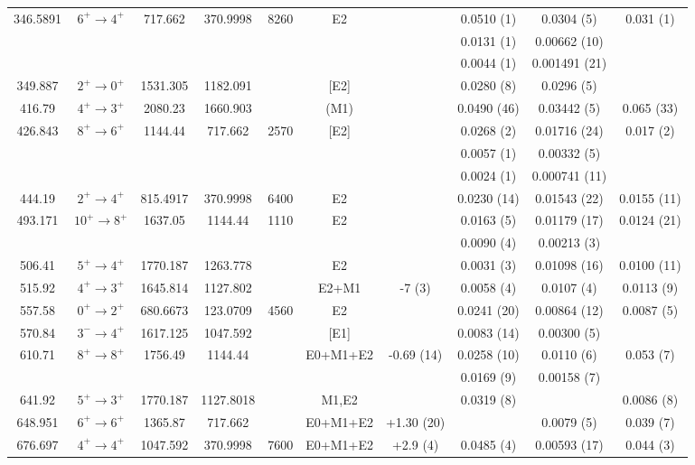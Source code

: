 \begin{landscape}
\begin{longtable}{c|c|c|c|c|c|c|c|c|c}
346.5891	&	$6^+	\rightarrow	4^+$	&	717.662	&	370.9998	&	8260	&	E2	&		&	0.0510	(1)	&	0.0304 (5)	&	0.031 (1)	\\
	&				&		&		&		&		&		&	0.0131	(1)	&	0.00662 (10)	&		\\
	&				&		&		&		&		&		&	0.0044	(1)	&	0.001491 (21)	&		\\
349.887	&	$2^+	\rightarrow	0^+$	&	1531.305	&	1182.091	&		&	[E2]	&		&	0.0280	(8)	&	0.0296 (5)	&		\\
416.79	&	$4^+	\rightarrow	3^+$	&	2080.23	&	1660.903	&		&	(M1)	&		&	0.0490	(46)	&	0.03442 (5)	&	0.065 (33)	\\
426.843	&	$8^+	\rightarrow	6^+$	&	1144.44	&	717.662	&	2570	&	[E2]	&		&	0.0268	(2)	&	0.01716 (24)	&	0.017 (2)	\\
	&				&		&		&		&		&		&	0.0057	(1)	&	0.00332 (5)	&		\\
	&				&		&		&		&		&		&	0.0024	(1)	&	0.000741 (11)	&		\\
444.19	&	$2^+	\rightarrow	4^+$	&	815.4917	&	370.9998	&	6400	&	E2	&		&	0.0230	(14)	&	0.01543 (22)	&	0.0155 (11)	\\
493.171	&	$10^+	\rightarrow	8^+$	&	1637.05	&	1144.44	&	1110	&	E2	&		&	0.0163	(5)	&	0.01179 (17)	&	0.0124 (21)	\\
	&				&		&		&		&		&		&	0.0090	(4)	&	0.00213 (3)	&		\\
506.41	&	$5^+	\rightarrow	4^+$	&	1770.187	&	1263.778	&		&	E2	&		&	0.0031	(3)	&	0.01098 (16)	&	0.0100 (11)	\\
515.92	&	$4^+	\rightarrow	3^+$	&	1645.814	&	1127.802	&		&	E2+M1	&	-7 (3)	&	0.0058	(4)	&	0.0107 (4)	&	0.0113 (9)	\\
557.58	&	$0^+	\rightarrow	2^+$	&	680.6673	&	123.0709	&	4560	&	E2	&		&	0.0241	(20)	&	0.00864 (12)	&	0.0087 (5)	\\
570.84	&	$3^-	\rightarrow	4^+$	&	1617.125	&	1047.592	&		&	[E1]	&		&	0.0083	(14)	&	0.00300 (5)	&		\\
610.71	&	$8^+	\rightarrow	8^+$	&	1756.49	&	1144.44	&		&	E0+M1+E2	&	-0.69 (14)	&	0.0258	(10)	&	0.0110 (6)	&	0.053 (7)	\\
	&				&		&		&		&		&		&	0.0169	(9)	&	0.00158 (7)	&		\\
641.92	&	$5^+	\rightarrow	3^+$	&	1770.187	&	1127.8018	&		&	M1,E2	&		&	0.0319 (8)	&		&	0.0086 (8)	\\
648.951	&	$6^+	\rightarrow	6^+$	&	1365.87	&	717.662	&		&	E0+M1+E2	&	+1.30 (20)	&		&	0.0079 (5)	&	0.039 (7)	\\
676.697	&	$4^+	\rightarrow	4^+$	&	1047.592	&	370.9998	&	7600	&	E0+M1+E2	&	+2.9 (4)	&	0.0485	(4)	&	0.00593 (17)	&	0.044 (3)	\\

\end{longtable}
\end{landscape}
